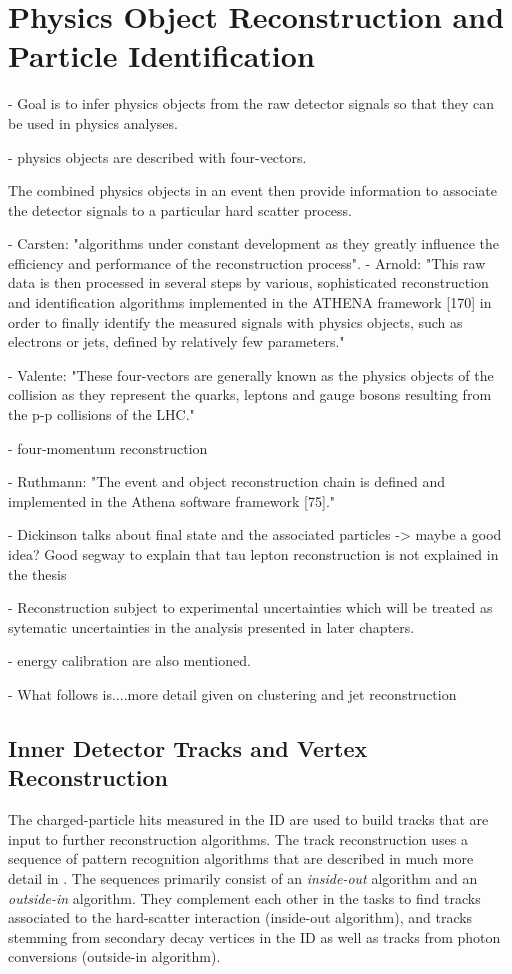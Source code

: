 
\chapter{Physics Object Reconstruction and Particle Identification}
\label{chap:objects}

- Goal is to infer physics objects from the raw detector signals so that they can be used in physics analyses. 

- physics objects are described with four-vectors.

The combined physics objects in an event then provide information to associate the detector signals to a particular hard scatter process. 

- Carsten: "algorithms under constant development as they greatly influence the efficiency and performance of the reconstruction process".
- Arnold: "This raw data is then processed in several steps by various, sophisticated reconstruction and identification algorithms implemented in the ATHENA framework [170] in order to finally identify the measured signals with physics objects, such as electrons or jets, defined by relatively few parameters."

- Valente: "These four-vectors are generally known as the physics objects of the collision as they represent the quarks, leptons and gauge bosons resulting from the p-p collisions of the LHC."

- four-momentum reconstruction

- Ruthmann: "The event and object reconstruction chain is defined and implemented in the Athena software framework [75]."

- Dickinson talks about final state and the associated particles -> maybe a good idea? Good segway to explain that tau lepton reconstruction is not explained in the thesis

- Reconstruction subject to experimental uncertainties which will be treated as sytematic uncertainties in the analysis presented in later chapters.

- energy calibration are also mentioned.

- What follows is....more detail given on clustering and jet reconstruction

\section{Inner Detector Tracks and Vertex Reconstruction}
The charged-particle hits measured in the ID are used to build tracks that are input to further reconstruction algorithms. 
The track reconstruction uses a sequence of pattern recognition algorithms that are described in much more detail in . The sequences primarily consist of an \emph{inside-out} algorithm and an \emph{outside-in} algorithm. They complement each other in the tasks to find tracks associated to the hard-scatter interaction (inside-out algorithm), and tracks stemming from secondary decay vertices in the ID as well as tracks from photon conversions (outside-in algorithm).

